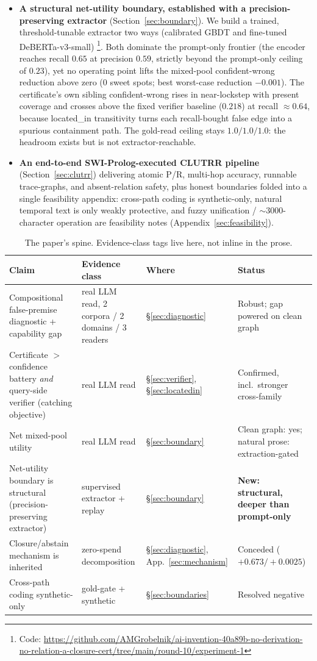 \documentclass[11pt,letterpaper]{article}
\begin{document}
\begin{itemize}
\item \textbf{A structural net-utility boundary, established with a precision-preserving extractor} (Section~\ref{sec:boundary}). We build a trained, threshold-tunable extractor two ways (calibrated GBDT and fine-tuned DeBERTa-v3-small) \footnote{Code: \url{https://github.com/AMGrobelnik/ai-invention-40a89b-no-derivation-no-relation-a-closure-cert/tree/main/round-10/experiment-1}}. Both dominate the prompt-only frontier (the encoder reaches recall $0.65$ at precision $0.59$, strictly beyond the prompt-only ceiling of $0.23$), yet no operating point lifts the mixed-pool confident-wrong reduction above zero ($0$ sweet spots; best worst-case reduction $-0.001$). The certificate's own sibling confident-wrong rises in near-lockstep with present coverage and crosses above the fixed verifier baseline ($0.218$) at recall ${\approx}0.64$, because \textsf{located\_in} transitivity turns each recall-bought false edge into a spurious containment path. The gold-read ceiling stays $1.0/1.0/1.0$: the headroom exists but is not extractor-reachable.
\item \textbf{An end-to-end SWI-Prolog-executed CLUTRR pipeline} (Section~\ref{sec:clutrr}) delivering atomic P/R, multi-hop accuracy, runnable trace-graphs, and absent-relation safety, plus honest boundaries folded into a single feasibility appendix: cross-path coding is synthetic-only, natural temporal text is only weakly protective, and fuzzy unification / ${\sim}3000$-character operation are feasibility notes (Appendix~\ref{sec:feasibility}).
\end{itemize}

\begin{table}[t]
\centering
\small
\begin{tabular}{p{2.5cm}p{1.7cm}p{1.3cm}p{1.35cm}}
\hline
Claim & Evidence class & Where & Status \\
\hline
Compositional false-premise diagnostic + capability gap & real LLM read, 2 corpora / 2 domains / 3 readers & \S\ref{sec:diagnostic} & Robust; gap powered on clean graph \\
Certificate $>$ confidence battery \emph{and} query-side verifier (catching objective) & real LLM read & \S\ref{sec:verifier}, \S\ref{sec:locatedin} & Confirmed, incl.\ stronger cross-family \\
Net mixed-pool utility & real LLM read & \S\ref{sec:boundary} & Clean graph: yes; natural prose: extraction-gated \\
Net-utility boundary is structural (precision-preserving extractor) & supervised extractor + replay & \S\ref{sec:boundary} & \textbf{New: structural, deeper than prompt-only} \\
Closure/abstain mechanism is inherited & zero-spend decomposition & \S\ref{sec:diagnostic}, App.~\ref{sec:mechanism} & Conceded ($+0.673/{+}0.0025$) \\
Cross-path coding synthetic-only & gold-gate + synthetic & \S\ref{sec:boundaries} & Resolved negative \\
\hline
\end{tabular}
\caption{The paper's spine. Evidence-class tags live here, not inline in the prose.}
\label{tab:spine}
\end{table}
\end{document}
